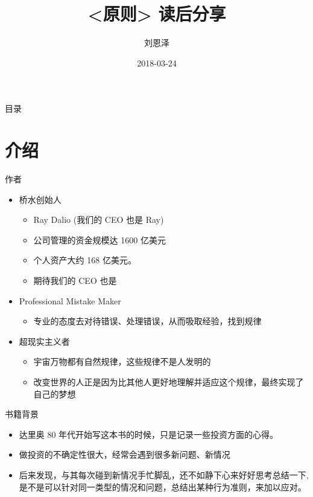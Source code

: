 \documentclass[presentation, bigger]{beamer}
\author{刘恩泽}
\date{2018-03-24}
\title{<原则> 读后分享}
\begin{document}
\maketitle
\begin{frame}{目录}
\tableofcontents
\end{frame}


\section{介绍}
\label{sec:org136704b}
\begin{frame}[label={sec:org35641ed}]{作者}
\begin{itemize}
\item 桥水创始人
\begin{itemize}
\item Ray Dalio (我们的 CEO 也是 Ray)
\item 公司管理的资金规模达 1600 亿美元
\item 个人资产大约 168 亿美元。
\item <2-> \alert{期待我们的 CEO 也是}
\end{itemize}

\item <3-> Professional Mistake Maker
\begin{itemize}
\item 专业的态度去对待错误、处理错误，从而吸取经验，找到规律
\end{itemize}

\item <4-> 超现实主义者
\begin{itemize}
\item 宇宙万物都有自然规律，这些规律不是人发明的
\item 改变世界的人正是因为比其他人更好地理解并适应这个规律，最终实现了自己的梦想
\end{itemize}
\end{itemize}
\end{frame}

\begin{frame}[label={sec:org4a4c53d}]{书籍背景}
\begin{itemize}
\item 达里奥 80 年代开始写这本书的时候，只是记录一些投资方面的心得。
\item <2-> 做投资的不确定性很大，经常会遇到很多新问题、新情况
\item <3-> 后来发现，与其每次碰到新情况手忙脚乱，还不如静下心来好好思考总结一下, \alert{是不是可以针对同一类型的情况和问题，总结出某种行为准则，来加以应对。}
\end{itemize}
\end{frame}
\end{document}
